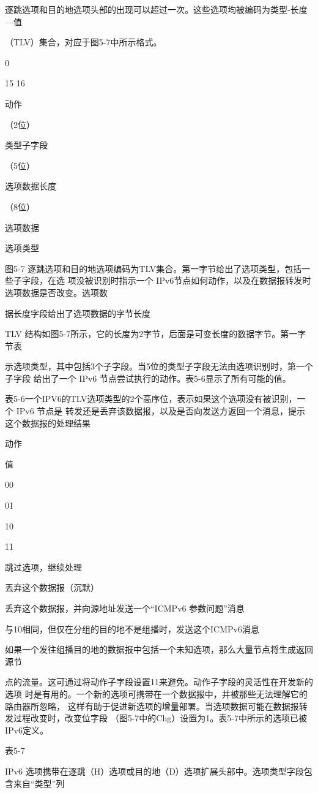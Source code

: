 逐跳选项和目的地选项头部的出现可以超过一次。这些选项均被编码为类型-长度—值

（TLV）集合，对应于图5-7中所示格式。

0

15 16

动作

（2位）

类型子字段

（5位）

选项数据长度

（8位）

选项数据

选项类型

图5-7 逐跳选项和目的地选项编码为TLV集合。第一字节给出了选项类型，包括一些子字段，在选
项没被识别时指示一个 IPv6节点如何动作，以及在数据报转发时选项数据是否改变。选项数

据长度字段给出了选项数据的字节长度

TLV 结构如图5-7所示，它的长度为2字节，后面是可变长度的数据字节。第一字节表

示选项类型，其中包括3个子字段。当5位的类型子字段无法由选项识别时，第一个子字段
给出了一个 IPv6 节点尝试执行的动作。表5-6显示了所有可能的值。

表5-6一个IPV6的TLV选项类型的2个高序位，表示如果这个选项没有被识别，一个 IPv6 节点是
转发还是丢弃该数据报，以及是否向发送方返回一个消息，提示这个数据报的处理结果

动作

值

00

01

10

11

跳过选项，继续处理

丟弃这个数据报（沉默）

丢弃这个数据报，并向源地址发送一个“ICMPv6 参数问题”消息

与10相同，但仅在分组的目的地不是组播时，发送这个ICMPv6消息

如果一个发往组播目的地的数据报中包括一个未知选项，那么大量节点将生成返回源节

点的流量。这可通过将动作子字段设置11来避免。动作子字段的灵活性在开发新的选项
时是有用的。一个新的选项可携带在一个数据报中，并被那些无法理解它的路由器所忽略，
这样有助于促进新选项的增量部署。当选项数据可能在数据报转发过程改变时，改变位字段
（图5-7中的Chg）设置为1。表5-7中所示的选项已被IPv6定义。

表5-7

IPv6 选项携带在逐跳（H）选项或目的地（D）选项扩展头部中。选项类型字段包含来自“类型”列

